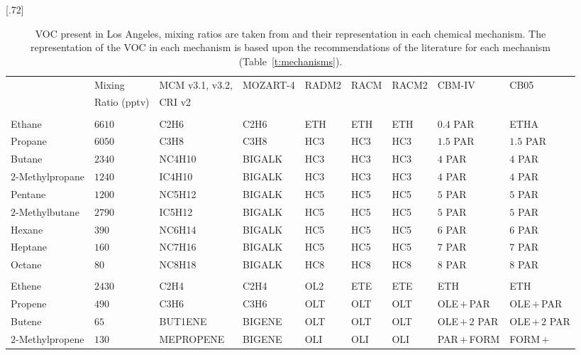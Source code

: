 \documentclass[acpd, online, hvmath]{copernicus}
\begin{document}
\begin{table}[t]
  \caption{VOC present in Los Angeles, mixing ratios are taken from \citet{Baker:2008} and their representation in each chemical mechanism. The representation of the VOC in each mechanism is based upon the recommendations of the literature for each mechanism (Table~\ref{t:mechanisms}).}
  \scalebox{.72}[.72]{\begin{tabular}{lllllllll}
      \tophline
      \multirow{2}{*}{{NMVOC}} &{Mixing} &{MCM v3.1, v3.2,} &\multirow{2}{*}{{MOZART-4}} &\multirow{2}{*}{{RADM2}} &\multirow{2}{*}{{RACM}} &\multirow{2}{*}{{RACM2}} &\multirow{2}{*}{{CBM-IV}} &\multirow{2}{*}{{CB05}}\\
      &{Ratio (pptv)} &{CRI v2} &&&&&&\\
      \middlehline \multicolumn{9}{c}{{Alkanes}}  \\ \middlehline
      Ethane &$6610$ &C2H6 &C2H6 &ETH &ETH &ETH &$0.4$ PAR &ETHA \\
      Propane  &$6050$ &C3H8 &C3H8 &HC3 &HC3 &HC3 &$1.5$ PAR &$1.5$ PAR \\
      Butane &$2340$ &NC4H10 &BIGALK &HC3 &HC3 &HC3 &$4$ PAR &$4$ PAR \\
      $2$-Methylpropane &$1240$ &IC4H10 &BIGALK &HC3 &HC3 &HC3 &$4$ PAR &$4$ PAR \\
      Pentane &$1200$ &NC5H12 &BIGALK &HC5 &HC5 &HC5 &$5$ PAR &$5$ PAR \\
      $2$-Methylbutane &$2790$ &IC5H12 &BIGALK &HC5 &HC5 &HC5 &$5$ PAR &$5$ PAR \\
      Hexane &$390$ &NC6H14 &BIGALK &HC5 &HC5 &HC5 &$6$ PAR &$6$ PAR \\
      Heptane &$160$ &NC7H16 &BIGALK &HC5 &HC5 &HC5 &$7$ PAR &$7$ PAR \\
      Octane &$80$ &NC8H18 &BIGALK &HC8 &HC8 &HC8 &$8$ PAR &$8$ PAR
      \\
      \middlehline
      \multicolumn{9}{c}{{Alkenes}} \\
      \middlehline
      Ethene &$2430$ &C2H4 &C2H4 &OL2 &ETE &ETE &ETH &ETH \\
      Propene &$490$ &C3H6 &C3H6 &OLT &OLT &OLT &OLE\,$+$\,PAR &OLE\,$+$\,PAR \\
      Butene &$65$ &BUT1ENE &BIGENE &OLT &OLT &OLT &OLE\,$+$\,$2$ PAR &OLE\,$+$\,$2$ PAR \\
      \multirow{2}{*}{$2$-Methylpropene} &\multirow{2}{*}{$130$}
      &\multirow{2}{*}{MEPROPENE} &\multirow{2}{*}{BIGENE}
      &\multirow{2}{*}{OLI} &\multirow{2}{*}{OLI}
      &\multirow{2}{*}{OLI} &PAR\,$+$\,FORM &FORM\,$+$\\

\end{tabular}}
\end{table}
\end{document}
